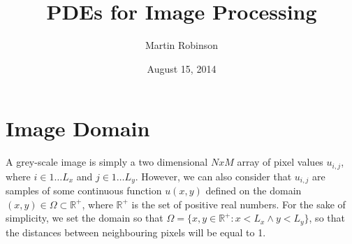 \documentclass[11pt,a4paper,noindent]{article}
\begin{document}

\title{PDEs for Image Processing}
\date{August 15, 2014}
\author{Martin Robinson}

\maketitle

%

\section{Image Domain}
A grey-scale image is simply a two dimensional $NxM$ array of pixel values $u_{i,j}$, where $i \in {1\ldots L_x}$ and $j \in {1\ldots L_y}$. However, we can also consider that $u_{i,j}$ are samples of some continuous function $u(x,y)$ defined on the domain $(x,y) \in \Omega \subset \mathbb{R}^+$, where $\mathbb{R}^+$ is the set of positive real numbers. For the sake of simplicity, we set the domain so that $\Omega = \{x,y \in \mathbb{R}^+: x < L_x \wedge y < L_y\}$, so that the distances between neighbouring pixels will be equal to 1.
\end{document}
